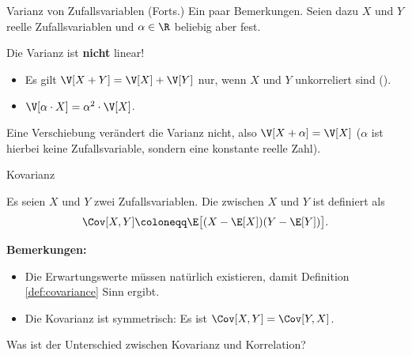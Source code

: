 \begin{frame}{Varianz von Zufallsvariablen (Forts.)}{}
	Ein paar Bemerkungen. Seien dazu $X$ und $Y$ reelle Zufallsvariablen und $\alpha \in \R$ beliebig aber fest.
	
	\begin{boxGray}
		Die Varianz ist \textbf{nicht} linear!
		\begin{itemize}
			\item Es gilt $\V[X + Y] = \V[X] + \V[Y]$ nur, wenn $X$ und $Y$ unkorreliert sind ().
			\item $\V[\alpha \cdot X] = \alpha^2 \cdot \V[X]$.
		\end{itemize}
	\end{boxGray}

	\begin{boxGray}
		Eine Verschiebung verändert die Varianz nicht, also $\V[X + \alpha] = \V[X]$ ($\alpha$ ist hierbei keine Zufallsvariable,
		sondern eine konstante reelle Zahl).
	\end{boxGray}
\end{frame}


\begin{frame}{Kovarianz}{}
	\begin{mydef}
		Es seien $X$ und $Y$ zwei Zufallsvariablen. Die  zwischen $X$ und $Y$ ist definiert als
		\begin{equation*}
			\Cov[X, Y] \coloneqq \E\bigl[ (X - \E[X]) (Y - \E[Y]) \bigr].
		\end{equation*}
	\end{mydef}

	\begin{boxGray}
		\textbf{Bemerkungen:}
		\begin{itemize}
			\item Die Erwartungswerte müssen natürlich existieren, damit Definition \ref{def:covariance} Sinn ergibt.
			\item Die Kovarianz ist symmetrisch: Es ist $\Cov[X, Y] = \Cov[Y, X]$.
		\end{itemize}
	\end{boxGray}
	
	\begin{mytask}
		Was ist der Unterschied zwischen Kovarianz und Korrelation?
	\end{mytask}
\end{frame}


